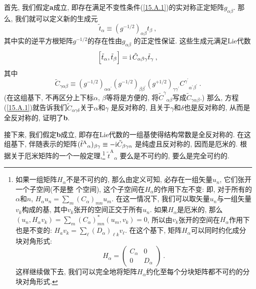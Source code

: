 首先, 我们假定\textbf{a}成立, 即存在满足不变性条件(\ref{15.A.1})的实对称正定矩阵$g_{\alpha \beta }$. 
那么, 我们就可以定义新的生成元
\begin{equation}
\tilde{t}_{\alpha }\equiv (g^{-1/2})_{\alpha \beta }t_{\beta }\:, \label{15.A.3}
\end{equation}%
其中实的逆平方根矩阵$g^{-1/2}$的存在性由$g_{\alpha \beta }$%
的正定性保证. 这些生成元满足Lie代数\begin{equation}
\Big[ \tilde{t}_{\alpha },\tilde{t}_{\beta }\Big] =\mathrm{i}\,\tilde{C}_{\alpha
\beta \gamma }\tilde{t}_{\gamma }\:,   \label{15.A.4}
\end{equation}%
其中\begin{equation}
\tilde{C}_{\gamma \alpha \beta  }\equiv (g^{-1/2})_{\alpha \alpha ^{\prime
}}(g^{-1/2})_{\beta \beta ^{\prime }}(g^{+1/2})_{\gamma \gamma ^{\prime
}}C^{\gamma ^{\prime }}{}_{\alpha ^{\prime }\beta ^{\prime }}\:. \label{15.A.5}
\end{equation}%
(在这组基下, 不再区分上下标$\alpha $, $\beta $等将是方便的, 
将$\tilde{C}^{\gamma }{}_{\alpha \beta }$写成$\tilde{C}_{\gamma \alpha \beta }$.) 
那么, 方程(\ref{15.A.1})就告诉我们$\tilde{C}_{\alpha \gamma \delta }$关于$\alpha $和$\gamma $%
是反对称的, 且关于$\gamma $和$\delta $也是反对称的, 从而是全反对称的, 证明了\textbf{b}.

接下来, 我们假定\textbf{b}成立, 即存在Lie代数的一组基使得结构常数是全反对称的. 在这组基下, 
伴随表示的矩阵$(\tilde{t}^{\mathrm{A}}{}_{\alpha})_{\beta \gamma }\equiv -\mathrm{i}\tilde{C}_{\beta \gamma \alpha }$%
是纯虚且反对称的, 因而是厄米的. 根据关于厄米矩阵的一个一般定理,\footnote{%
如果一组矩阵$H_{\alpha }$不是不可约的, 那么由定义可知, 必存在一组矢量$u_{n}$, 它们张开一个子空间(不是整%
个空间), 这个子空间在$H_{\alpha }$的作用下左不变: 即, 对于所有的$\alpha $和$n$, $%
H_{\alpha }u_{n}=\sum_{m}(C_{\alpha })_{mn}u_{m}$. 在这一情况下, 我们可以取矢量$u_{n}$与一组矢量$v_{k}
$构成的基, 其中$v_{k}$张开的空间正交于所有$u_{n}$. 如果$H_{\alpha }$是厄米的, 
那么$(u_{n},H_{\alpha}v_{k})=\sum_{m}(C_{\alpha })_{mn}^{\ast }(u_{m},v_{k})=0$, 
所以由$v_{k}$张开的空间在$H_{\alpha }$作用下也是不变的: $H_{a}v_{k}=\sum_{\ell }(D_{\alpha
})_{\ell k}v_{\ell }$. 在这个基下, 矩阵$H_{\alpha }$可以同时约化成分块对角形式:%
\[
H_{\alpha }=
\begin{pmatrix}
    C_{\alpha } & 0 \\
    0           & D_{\alpha} 
\end{pmatrix} \:. 
\]%
这样继续做下去, 我们可以完全地将矩阵$H_{\alpha }$约化至每个分块矩阵都不可约的分块对角形式.} $\tilde{t}^{\mathrm{A}}{}_{\alpha }$%
要么是不可约的, 要么是完全可约的.

